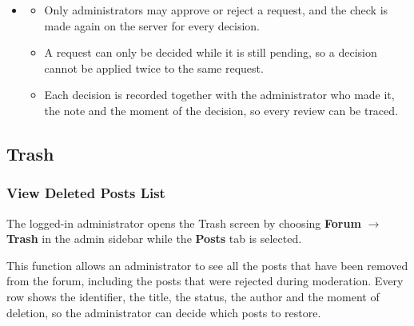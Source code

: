 \begin{itemize}[leftmargin=1.6em,topsep=4pt,itemsep=3pt,parsep=0pt,label=$\bullet$]
\begin{itemize}[leftmargin=2.2em,topsep=2pt,itemsep=3pt,parsep=0pt,label=$\circ$]
            \item \textbf{Lost Connection}: When the connection to the server is lost, the decision is not saved and the screen asks the user to try again.
        \end{itemize}
    \item {}
        \begin{itemize}[leftmargin=2.2em,topsep=2pt,itemsep=3pt,parsep=0pt,label=$\circ$]
            \item Only administrators may approve or reject a request, and the check is made again on the server for every decision.
            \item A request can only be decided while it is still pending, so a decision cannot be applied twice to the same request.
            \item Each decision is recorded together with the administrator who made it, the note and the moment of the decision, so every review can be traced.
        \end{itemize}
\end{itemize}


\subsection{Trash}

\subsubsection{View Deleted Posts List}

 The logged-in administrator opens the Trash screen by choosing \textbf{Forum} $\rightarrow$ \textbf{Trash} in the admin sidebar while the \textbf{Posts} tab is selected.

 This function allows an administrator to see all the posts that have been removed from the forum, including the posts that were rejected during moderation. Every row shows the identifier, the title, the status, the author and the moment of deletion, so the administrator can decide which posts to restore.

